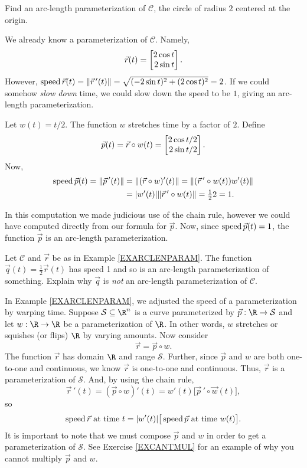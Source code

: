 \begin{example}
	\label{EXARCLENPARAM}
	Find an arc-length parameterization of $\mathcal C$, the circle of radius $2$ centered at the origin.

	We already know a parameterization of $\mathcal C$.  Namely,
	\[
		\vec r(t) =\mat{2\cos t\\2\sin t}.
	\]
	However, $\operatorname{speed} \vec r(t) =\lVert\vec r\,'(t)\rVert = \sqrt{(-2\sin t)^2+(2\cos t)^2} = 2$.  If we could
	somehow \emph{slow down} time, we could slow down the speed to be $1$, giving an arc-length parameterization.

	Let $w(t)=t/2$.  The function $w$ stretches time by a factor of $2$.  Define
	\[
		\vec p(t) = \vec r\circ w(t) = \mat{2\cos t/2\\2\sin t/2}.
	\]
	Now, 
	\begin{align*}
		\operatorname{speed} \vec p(t) = \lVert\vec p\,'(t)\rVert&=\lVert(\vec r\circ w)'(t)\rVert = \lVert(\vec r\,'\circ w(t))w'(t)\rVert\\
		&=\lvert w'(t)\rvert\lVert\vec r\,'\circ w(t)\rVert = \tfrac{1}{2}2=1.
	\end{align*}

	In this computation we made judicious use of the chain rule, however we could have computed
	directly from our formula for $\vec p$.  Now,
	since $\operatorname{speed}\vec p(t)=1$, the function $\vec p$ is an arc-length parameterization.
\end{example}

\begin{exercise}
	\label{EXCANTMUL}
	Let $\mathcal C$ and $\vec r$ be as in Example \ref{EXARCLENPARAM}.  The function $\vec q(t)=\tfrac{1}{2}\vec r(t)$
	has speed 1 and so is an arc-length parameterization of something.  Explain why $\vec q$ is \emph{not}
	an arc-length parameterization of $\mathcal C$.
\end{exercise}

In Example \ref{EXARCLENPARAM}, we adjusted the speed of a parameterization by warping time.  Suppose
$\mathcal S\subseteq \R^n$ is a curve parameterized by $\vec p:\R\to \mathcal S$ and let $w:\R\to\R$ be 
a parameterization of $\R$.  In other words, $w$ stretches or squishes (or flips) $\R$ by varying amounts.
Now consider
\[
	\vec r=\vec p\circ w.
\]
The function $\vec r$ has domain $\R$ and range $\mathcal S$.  Further, since $\vec p$ and $w$ are both
one-to-one and continuous, we know $\vec r$ is one-to-one and continuous.  Thus, $\vec r$ is a parameterization
of $\mathcal S$.  And, by using the chain rule,
\[
	\vec r\,'(t) = (\vec p\circ w)'(t) = w'(t)\big[\vec p\,'\circ \vec w(t)\big],
\]
so
\[
	\operatorname{speed}\vec r\text{ at time $t$} = \lvert w'(t)\rvert\big[\operatorname{speed} \vec p\text{ at time $w(t)$}\big].
\]
It is important to note that we must compose $\vec p$ and $w$ in order to get a parameterization of $\mathcal S$.
See Exercise \ref{EXCANTMUL} for an example of why you cannot multiply $\vec p$ and $w$.


